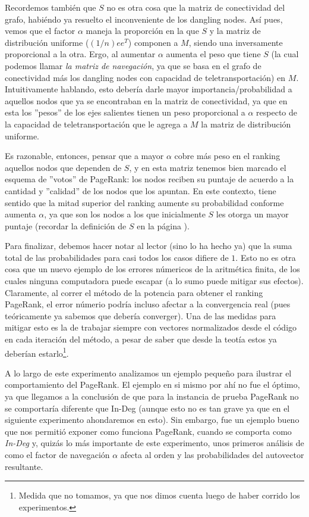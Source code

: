 \par Recordemos tambi\'en que $S$ no es otra cosa que la matriz de conectividad
del grafo, habi\'endo ya resuelto el inconveniente de los dangling nodes. As\'i
pues, vemos que el factor $\alpha$ maneja la proporci\'on en la que $S$ y la
matriz de distribuci\'on uniforme ($(1/n)ee^T$) componen a $M$, siendo una
inversamente proporcional a la otra. Ergo, al aumentar $\alpha$ aumenta el peso
que tiene $S$ (la cual podemos llamar \emph{la matriz de navegaci\'on}, ya que
se basa en el grafo de conectividad m\'as los dangling nodes con capacidad de
teletransportaci\'on) en $M$. Intuitivamente hablando, esto deber\'ia darle
mayor importancia/probabilidad a aquellos nodos que ya se encontraban en la
matriz de conectividad, ya que en esta los ''pesos'' de los ejes salientes
tienen un peso proporcional a $\alpha$ respecto de la capacidad de
teletransportaci\'on que le agrega a $M$ la matriz de distribuci\'on uniforme.

\par Es razonable, entonces, pensar que a mayor $\alpha$ cobre m\'as peso en el
ranking aquellos nodos que dependen de $S$, y en esta matriz tenemos bien
marcado el esquema de ''votos'' de PageRank: los nodos reciben su puntaje de
acuerdo a la cantidad y ''calidad'' de los nodos que los apuntan. En este
contexto, tiene sentido que la mitad superior del ranking aumente su
probabilidad conforme aumenta $\alpha$, ya que son los nodos a los que
inicialmente $S$ les otorga un mayor puntaje (recordar la definici\'on de $S$ en
la p\'agina \pageref{eq:S}).

\par Para finalizar, debemos hacer notar al lector (sino lo ha hecho ya) que la
suma total de las probabilidades para casi todos los casos difiere de $1$. Esto
no es otra cosa que un nuevo ejemplo de los errores n\'umericos de la
aritm\'etica finita, de los cuales ninguna computadora puede escapar (a lo sumo
puede mitigar sus efectos). Claramente, al correr el m\'etodo de la potencia
para obtener el ranking PageRank, el error n\'umerio podr\'ia incluso afectar a
la convergencia real (pues te\'oricamente ya sabemos que deber\'ia converger).
Una de las medidas para mitigar esto es la de trabajar siempre con vectores
normalizados desde el c\'odigo en cada iteraci\'on del m\'etodo, a pesar de
saber que desde la teot\'ia estos ya deber\'ian estarlo\footnote{Medida que no
tomamos, ya que nos dimos cuenta luego de haber corrido los experimentos.}.

\par A lo largo de este experimento analizamos un ejemplo peque\~no para
ilustrar el comportamiento del PageRank. El ejemplo en si mismo por ah\'i no fue
el \'optimo, ya que llegamos a la conclusi\'on de que para la instancia de
prueba PageRank no se comportar\'ia diferente que In-Deg (aunque esto no es tan
grave ya que en el siguiente experimento ahondaremos en esto). Sin embargo, fue
un ejemplo bueno que nos permiti\'o exponer como funciona PageRank, cuando se
comporta como \emph{In-Deg} y, quiz\'as lo m\'as importante de este experimento,
unos primeros an\'alisis de como el factor de navegaci\'on $\alpha$ afecta al
orden y las probabilidades del autovector resultante.
